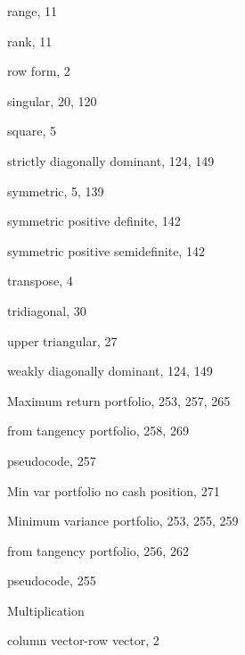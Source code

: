 {\noindent\hspace*{1.4em}range, 11

\noindent\hspace*{1.4em}rank, 11

\noindent\hspace*{1.4em}row form, 2

\noindent\hspace*{1.4em}singular, 20, 120

\noindent\hspace*{1.4em}square, 5

\noindent\hspace*{1.4em}strictly diagonally dominant, 124, 149

\noindent\hspace*{1.4em}symmetric, 5, 139

\noindent\hspace*{1.4em}symmetric positive definite, 142

\noindent\hspace*{1.4em}symmetric positive semidefinite, 142

\noindent\hspace*{1.4em}transpose, 4

\noindent\hspace*{1.4em}tridiagonal, 30

\noindent\hspace*{1.4em}upper triangular, 27

\noindent\hspace*{1.4em}weakly diagonally dominant, 124, 149

\noindent Maximum return portfolio, 253, 257, 265

\noindent\hspace*{1.4em}from tangency portfolio, 258, 269

\noindent\hspace*{1.4em}pseudocode, 257

\noindent Min var portfolio no cash position, 271

\noindent Minimum variance portfolio, 253, 255, 259

\noindent\hspace*{1.4em}from tangency portfolio, 256, 262

\noindent\hspace*{1.4em}pseudocode, 255

\noindent Multiplication

\noindent\hspace*{1.4em}column vector-row vector, 2

}
